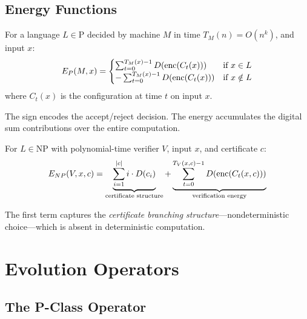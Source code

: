 \subsection{Energy Functions}

\begin{definition}\label{def:p-energy}
For a language $L \in \text{P}$ decided by machine $M$ in time $T_M(n) = O(n^k)$, and input $x$:
\begin{equation}
E_P(M, x) = \begin{cases}
\sum_{t=0}^{T_M(x)-1} D(\operatorname{enc}(C_t(x))) & \text{if } x \in L \\
-\sum_{t=0}^{T_M(x)-1} D(\operatorname{enc}(C_t(x))) & \text{if } x \notin L
\end{cases}
\end{equation}
where $C_t(x)$ is the configuration at time $t$ on input $x$.
\end{definition}

The sign encodes the accept/reject decision. The energy accumulates the digital sum contributions over the entire computation.

\begin{definition}\label{def:np-energy}
For $L \in \text{NP}$ with polynomial-time verifier $V$, input $x$, and certificate $c$:
\begin{equation}
E_{NP}(V, x, c) = \underbrace{\sum_{i=1}^{|c|} i \cdot D(c_i)}_{\text{certificate structure}} + \underbrace{\sum_{t=0}^{T_V(x,c)-1} D(\operatorname{enc}(C_t(x,c)))}_{\text{verification energy}}
\end{equation}
\end{definition}

The first term captures the \textit{certificate branching structure}—nondeterministic choice—which is absent in deterministic computation.

\section{Evolution Operators}

\subsection{The P-Class Operator}

